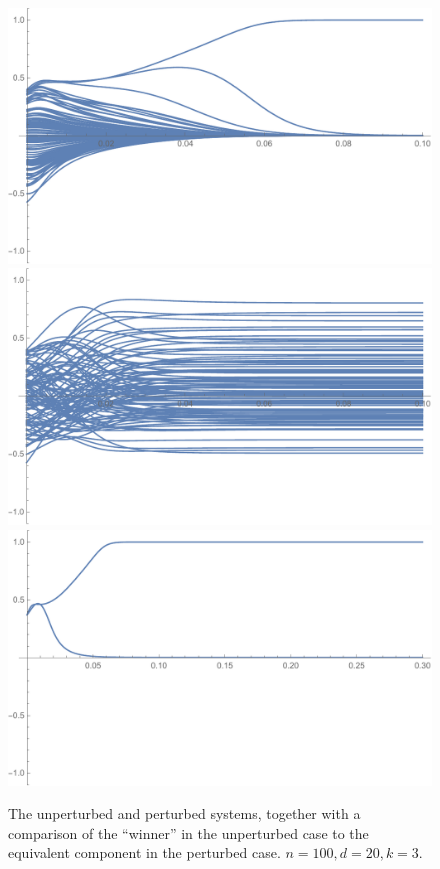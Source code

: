 \documentclass{hw-scrartcl}
\begin{document}
\begin{figure}[p]
  \centering
  \includegraphics[width=\linewidth*2/3]{perturbation-analysis-failure/unperturbed-large.pdf}
  \vfill
  \includegraphics[width=\linewidth*2/3]{perturbation-analysis-failure/perturbed-large.pdf}
  \vfill
  \includegraphics[width=\linewidth*2/3]{perturbation-analysis-failure/max-comparison-large.pdf}
  \caption{The unperturbed and perturbed systems, together with a comparison of the ``winner'' in the unperturbed case to the equivalent component in the perturbed case. \(n = 100, d=20, k=3.\)}
  \label{fig:perturbation-failure-large}
\end{figure}
\end{document}
